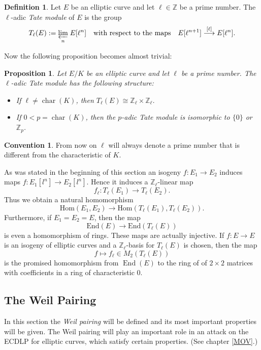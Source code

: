 \documentclass{article}
\numberwithin{equation}{section}
\newtheorem{proposition}[theorem]{Proposition}
\theoremstyle{definition}
\newtheorem{definition}[theorem]{Definition}
\newtheorem*{convention}{Convention}
\newcommand{\ZZ}{{\mathbb Z}} %
\newcommand{\Char}[1]{\operatorname{char} (#1)} %
\newcommand{\Endring}[1]{\operatorname{End} (#1)} %
\newcommand{\invlim}[1]{\underset{#1}{\varprojlim}} %
\begin{document}
\begin{definition}
Let $E$ be an elliptic curve and let $\ell\in\ZZ$ be a prime number. The $\ell$-adic \emph{Tate module} of $E$ is the group $$T_\ell(E):=\invlim{n} \; E[\ell^n] \quad \text{with respect to the maps} \quad E[\ell^{n+1}] \overset{[\ell]}{\longrightarrow} E[\ell^n].$$
\end{definition}

Now the following proposition becomes almost trivial:

\begin{proposition}
Let $E/K$ be an elliptic curve and let $\ell$ be a prime number. The $\ell$-adic Tate module has the following structure:
\begin{itemize}
\item If $\ell \neq \Char{K}$, then $T_\ell(E) \cong \ZZ_\ell \times \ZZ_\ell$.
\item If $0<p=\Char{K}$, then the $p$-adic Tate module is isomorphic to $\{0\}$ or $\ZZ_p$.
\end{itemize}
\end{proposition}

\begin{convention}
From now on $\ell$ will always denote a prime number that is different from the characteristic of $K$.
\end{convention}

As was stated in the beginning of this section an isogeny $f:E_1 \rightarrow E_2$ induces maps $f:E_1[l^n] \rightarrow E_2[l^n]$. Hence it induces a $\ZZ_\ell$-linear map \begin{equation}\label{indmorphTM}f_\ell:T_\ell(E_1) \rightarrow T_\ell(E_2).\end{equation} Thus we obtain a natural homomorphism $$\text{Hom}(E_1,E_2) \rightarrow \text{Hom}(T_\ell(E_1),T_\ell(E_2)).$$ Furthermore, if $E_1=E_2=E$, then the map $$\text{End}(E)\rightarrow\text{End}(T_\ell(E))$$ is even a homomorphism of rings. These maps are actually injective. If $f:E \rightarrow E$ is an isogeny of elliptic curves and a $\ZZ_\ell$-basis for $T_\ell(E)$ is chosen, then the map $$f \mapsto f_\ell \in M_2(T_\ell(E))$$ is the promised homomorphism from $\Endring{E}$ to the ring of of $2 \times 2$ matrices with coefficients in a ring of characteristic $0$.




\subsection{The Weil Pairing}\label{Weilpairing}
In this section the \emph{Weil pairing} will be defined and its most important properties will be given. The Weil pairing will play an important role in an attack on the ECDLP for elliptic curves, which satisfy certain properties. (See chapter \ref{MOV}.)
\end{document}
